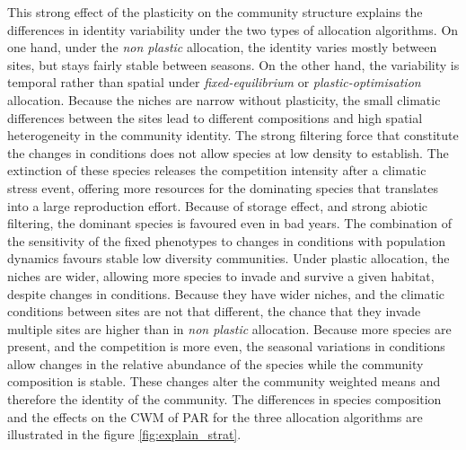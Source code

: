 This strong effect of the plasticity on the community structure explains the differences in identity variability under the two types of allocation algorithms. On one hand, under the \textit{non plastic} allocation, the identity varies mostly between sites, but stays fairly stable between seasons. On the other hand, the variability is temporal rather than spatial under \textit{fixed-equilibrium} or \textit{plastic-optimisation} allocation. Because the niches are narrow without plasticity, the small climatic differences between the sites lead to different compositions and high spatial heterogeneity in the community identity. The strong filtering force that constitute the changes in conditions does not allow species at low density to establish. The extinction of these species releases the competition intensity after a climatic stress event, offering more resources for the dominating species that translates into a large reproduction effort. Because of storage effect, and strong abiotic filtering, the dominant species is favoured even in bad years. The combination of the sensitivity of the fixed phenotypes to changes in conditions with population dynamics favours stable low diversity communities. Under plastic allocation, the niches are wider, allowing more species to invade and survive a given habitat, despite changes in conditions. Because they have wider niches, and the climatic conditions between sites are not that different, the chance that they invade multiple sites are higher than in \textit{non plastic} allocation. Because more species are present, and the competition is more even, the seasonal variations in conditions allow changes in the relative abundance of the species while the community composition is stable. These changes alter the community weighted means and therefore the identity of the community. The differences in species composition and the effects on the CWM of PAR for the three allocation algorithms are illustrated in the figure \ref{fig:explain_strat}.

